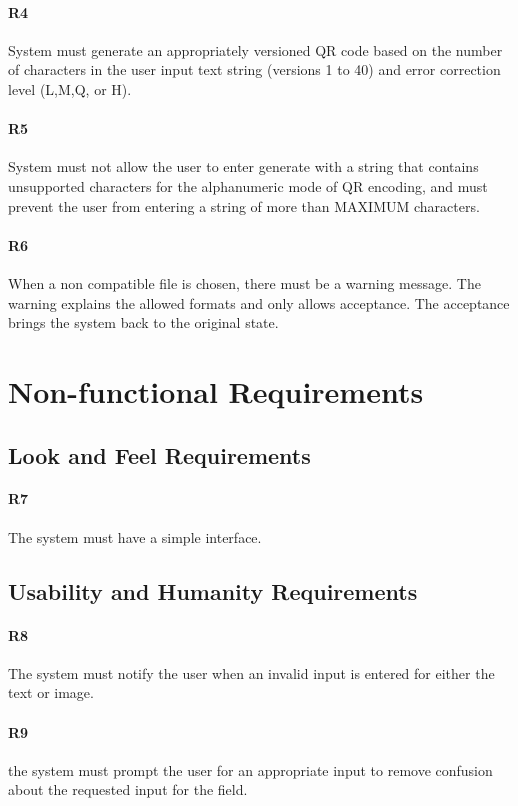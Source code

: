 \documentclass[12pt, titlepage]{article}
\begin{document}
	\paragraph{R4}
	System must generate an appropriately versioned QR code based on the number of 
	characters in the user input text string (versions 1 to 40) and error 
	correction level (L,M,Q, or H).
	\paragraph{R5}
	System must not allow the user to enter generate with a string that contains unsupported 
	characters for the alphanumeric mode of QR encoding, and must prevent the 
	user from entering a string of more than MAXIMUM characters.
	\paragraph{R6}	
	When a non compatible file is chosen, there must be a warning message. The 
	warning explains the allowed formats and only allows acceptance. The 
	acceptance brings the system back to the original state.
	
	

\section{Non-functional Requirements}

\subsection{Look and Feel Requirements}
	
	 \paragraph{R7}The system must have a simple interface.
	
	
\subsection{Usability and Humanity Requirements}

    \paragraph{R8}
	The system must notify the user when an invalid input is entered for either 
	the text or image.
    \paragraph{R9}
	the system must prompt the user for an appropriate input to 
	remove confusion about the requested input for the field.
\end{document}

